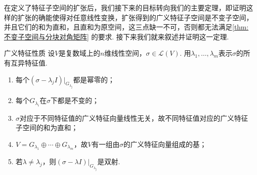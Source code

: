 在定义了特征子空间的扩张后，我们接下来的目标转向我们的主要定理，即证明这样的扩张的确能使得对任意线性变换，扩张得到的广义特征子空间是不变子空间，并且它们的和为直和，且直和为原空间，这三点缺一不可，否则都无法满足\autoref{thm:不变子空间与分块对角矩阵} 的要求. 接下来我们就来叙述并证明这一定理.
\begin{theorem}{}{广义特征性质}
    设$V$是复数域上的$n$维线性空间，$\sigma\in \mathcal{L}(V)$. 用$\lambda_1,\ldots,\lambda_m$表示$\sigma$的所有互异特征值.
    \begin{enumerate}[label=(\arabic*)]
        \item \label{item:16:广义特征性质:1}
              每个$(\sigma-\lambda_j I)\vert_{G_{\lambda_j}}$都是幂零的；

        \item 每个$G_{\lambda_i}$在$\sigma$下都是不变的；

        \item $\sigma$对应于不同特征值的广义特征向量线性无关，故不同特征值对应的广义特征子空间的和为直和；

        \item \label{item:16:广义特征性质:4}
              $V=G_{\lambda_1}\oplus\cdots\oplus G_{\lambda_m}$，故$V$有一组由$\sigma$的广义特征向量组成的基；

        \item 若$\lambda\neq\lambda_j$，则$(\sigma-\lambda I)\vert_{G_{\lambda_j}}$是双射.
    \end{enumerate}
\end{theorem}

